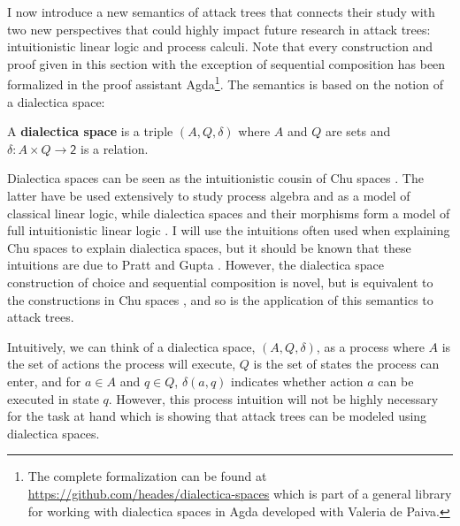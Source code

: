 \documentclass{llncs}
\begin{document}
I now introduce a new semantics of attack trees that connects their
study with two new perspectives that could highly impact future
research in attack trees: intuitionistic linear logic and process
calculi.  Note that every construction and proof given in this section
with the exception of sequential composition has been formalized in
the proof assistant Agda\footnote{The complete formalization can be
  found at \url{https://github.com/heades/dialectica-spaces} which is
  part of a general library for working with dialectica spaces in Agda
  developed with Valeria de Paiva.}.  The semantics is based on the
notion of a dialectica space:

\begin{definition}
  \label{def:dialectica-space}
  A \textbf{dialectica space} is a triple $(A, Q, \delta)$ where $A$
  and $Q$ are sets and $\delta : A \times Q \to \mathsf{2}$ is a
  relation.
\end{definition}
Dialectica spaces can be seen as the intuitionistic cousin
\cite{dePaiva:2006b} of Chu spaces \cite{Pratt:1999}.  The latter have
be used extensively to study process algebra and as a model of
classical linear logic, while dialectica spaces and their morphisms
form a model of full intuitionistic linear logic \cite{?}. I will use
the intuitions often used when explaining Chu spaces to explain
dialectica spaces, but it should be known that these intuitions are
due to Pratt and Gupta \cite{?}.  However, the dialectica space
construction of choice and sequential composition is novel, but is
equivalent to the constructions in Chu spaces \cite{?}, and so is the
application of this semantics to attack trees.

Intuitively, we can think of a dialectica space, $(A , Q, \delta)$, as
a process where $A$ is the set of actions the process will execute,
$Q$ is the set of states the process can enter, and for $a \in A$ and
$q \in Q$, $\delta(a , q)$ indicates whether action $a$ can be
executed in state $q$.  However, this process intuition will not be
highly necessary for the task at hand which is showing that attack
trees can be modeled using dialectica spaces.
\end{document}

